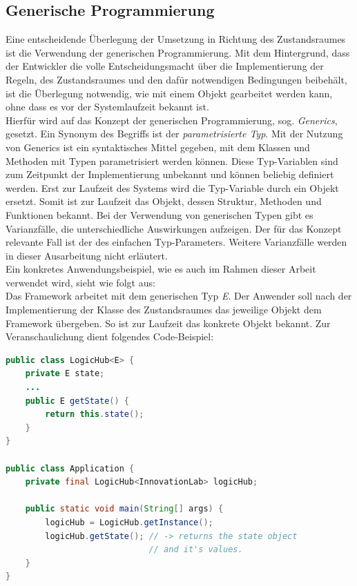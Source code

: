 \subsection{Generische Programmierung} %
\label{subsec:java_generics}
Eine entscheidende Überlegung der Umsetzung in Richtung des Zustandsraumes ist die Verwendung der generischen Programmierung. 
Mit dem Hintergrund, dass der Entwickler die volle Entscheidungsmacht über die Implementierung der 
Regeln, des Zustandsraumes und den dafür notwendigen Bedingungen beibehält, ist die Überlegung  
notwendig, wie mit einem Objekt gearbeitet werden kann, ohne dass es vor der Systemlaufzeit bekannt ist. 
\\
\linebreak
Hierfür wird auf das Konzept der generischen Programmierung, sog. \textit{Generics}, gesetzt. Ein Synonym 
des Begriffs ist der \textit{parametrisierte Typ}. Mit der Nutzung von Generics ist ein syntaktisches Mittel 
gegeben, mit dem Klassen und Methoden mit Typen parametrisiert werden können. Diese Typ-Variablen sind zum 
Zeitpunkt der Implementierung unbekannt und können beliebig definiert werden. Erst zur Laufzeit des Systems 
wird die Typ-Variable durch ein Objekt ersetzt. Somit ist zur Laufzeit das 
Objekt, dessen Struktur, Methoden und Funktionen bekannt. Bei der Verwendung von generischen Typen gibt es 
Varianzfälle, die unterschiedliche Auswirkungen aufzeigen. Der für das Konzept relevante Fall ist der des 
einfachen Typ-Parameters. Weitere Varianzfälle werden in dieser Ausarbeitung nicht erläutert. 
\\
\linebreak
Ein konkretes Anwendungsbeispiel, wie es 
auch im Rahmen dieser Arbeit verwendet wird, sieht wie folgt aus:
\\
Das Framework arbeitet mit dem generischen Typ \textit{E}. Der Anwender soll nach der Implementierung der Klasse des Zustandsraumes das 
jeweilige Objekt dem Framework übergeben. So ist zur Laufzeit das konkrete Objekt bekannt. Zur Veranschaulichung dient folgendes Code-Beispiel:
\begin{lstlisting}[language=Java, frame=lines, xleftmargin=\parindent, style=algoBericht, label={code:generics}, captionpos=b, caption={Zustandsobjekt als Typ-Variable}]
public class LogicHub<E> {
    private E state;
    ...
    public E getState() {
        return this.state();
    }
}

public class Application {
    private final LogicHub<InnovationLab> logicHub;

    public static void main(String[] args) {
        logicHub = LogicHub.getInstance();
        logicHub.getState(); // -> returns the state object 
                             // and it's values.
    }
}
\end{lstlisting}
